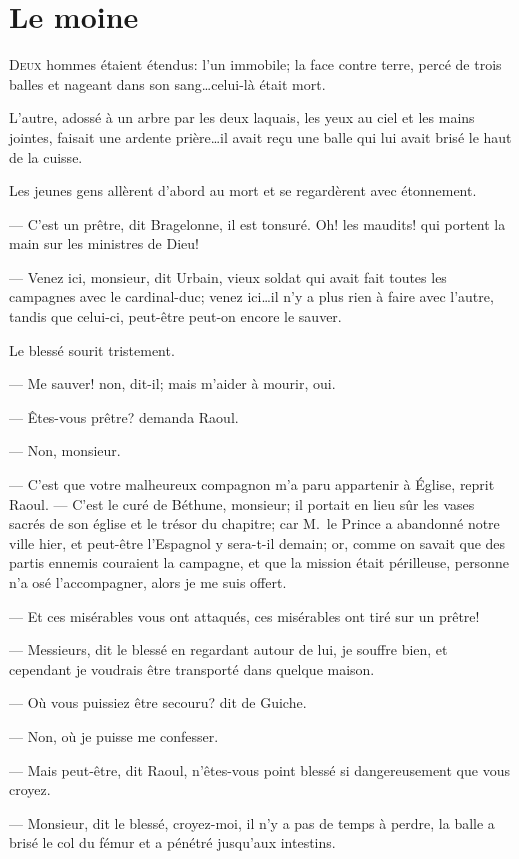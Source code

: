 \chapter{Le moine}

\lettrine{D}{eux} hommes étaient étendus: l'un immobile; la face contre terre, percé de trois balles et nageant dans son sang\dots celui-là était mort.

\zz
L'autre, adossé à un arbre par les deux laquais, les yeux au ciel et les mains jointes, faisait une ardente prière\dots il avait reçu une balle qui lui avait brisé le haut de la cuisse.

Les jeunes gens allèrent d'abord au mort et se regardèrent avec étonnement.

— C'est un prêtre, dit Bragelonne, il est tonsuré. Oh! les maudits! qui portent la main sur les ministres de Dieu!

— Venez ici, monsieur, dit Urbain, vieux soldat qui avait fait toutes les campagnes avec le cardinal-duc; venez ici\dots il n'y a plus rien à faire avec l'autre, tandis que celui-ci, peut-être peut-on encore le sauver.

Le blessé sourit tristement.

— Me sauver! non, dit-il; mais m'aider à mourir, oui.

— Êtes-vous prêtre? demanda Raoul.

— Non, monsieur.

— C'est que votre malheureux compagnon m'a paru appartenir à Église, reprit Raoul.
— C'est le curé de Béthune, monsieur; il portait en lieu sûr les vases sacrés de son église et le trésor du chapitre; car M.~le Prince a abandonné notre ville hier, et peut-être l'Espagnol y sera-t-il demain; or, comme on savait que des partis ennemis couraient la campagne, et que la mission était périlleuse, personne n'a osé l'accompagner, alors je me suis offert.

— Et ces misérables vous ont attaqués, ces misérables ont tiré sur un prêtre!

— Messieurs, dit le blessé en regardant autour de lui, je souffre bien, et cependant je voudrais être transporté dans quelque maison.

— Où vous puissiez être secouru? dit de Guiche.

— Non, où je puisse me confesser.

— Mais peut-être, dit Raoul, n'êtes-vous point blessé si dangereusement que vous croyez.

— Monsieur, dit le blessé, croyez-moi, il n'y a pas de temps à perdre, la balle a brisé le col du fémur et a pénétré jusqu'aux intestins.


